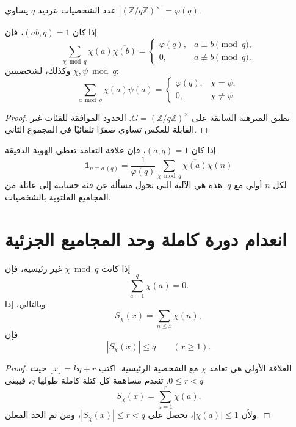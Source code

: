 عدد الشخصيات بترديد \(q\) يساوي
\(|(\mathbb Z/q\mathbb Z)^{\times}|=\varphi(q)\).

\begin{corollary}
\label{cor:dirichlet-character-orthogonality}
\provedhere
إذا كان \((ab,q)=1\)، فإن
\[
\sum_{\chi\bmod q}\chi(a)\overline{\chi(b)}
=
\begin{cases}
\varphi(q),&a\equiv b\pmod q,\\
0,&a\not\equiv b\pmod q.
\end{cases}
\]
وكذلك، لشخصيتين \(\chi,\psi\bmod q\):
\[
\sum_{a\bmod q}\chi(a)\overline{\psi(a)}
=
\begin{cases}
\varphi(q),&\chi=\psi,\\
0,&\chi\ne\psi.
\end{cases}
\]
\end{corollary}

\begin{proof}
نطبق المبرهنة السابقة على
\(G=(\mathbb Z/q\mathbb Z)^{\times}\). الحدود الموافقة للفئات غير
القابلة للعكس تساوي صفرًا تلقائيًا في المجموع الثاني.
\end{proof}

\begin{remark}
إذا كان \((a,q)=1\)، فإن علاقة التعامد تعطي الهوية الدقيقة
\[
\mathbf 1_{n\equiv a\, (q)}
=
\frac1{\varphi(q)}
\sum_{\chi\bmod q}\overline{\chi(a)}\chi(n)
\]
لكل \(n\) أولي مع \(q\). هذه هي الآلية التي تحول مسألة عن فئة حسابية
إلى عائلة من المجاميع الملتوية بالشخصيات.
\end{remark}

\section{انعدام دورة كاملة وحد المجاميع الجزئية}

\begin{proposition}
\label{prop:nonprincipal-character-partial-sums}
\provedhere
إذا كانت \(\chi\bmod q\) غير رئيسية، فإن
\[
\sum_{a=1}^{q}\chi(a)=0.
\]
وبالتالي، إذا
\[
S_\chi(x)=\sum_{n\leq x}\chi(n),
\]
فإن
\[
|S_\chi(x)|\leq q
\qquad(x\geq1).
\]
\end{proposition}

\begin{proof}
العلاقة الأولى هي تعامد \(\chi\) مع الشخصية الرئيسية. اكتب
\(\lfloor x\rfloor=kq+r\) حيث \(0\leq r<q\). تنعدم مساهمة كل كتلة
كاملة طولها \(q\)، فيبقى
\[
S_\chi(x)=\sum_{a=1}^{r}\chi(a).
\]
ولأن \(|\chi(a)|\leq1\)، نحصل على \(|S_\chi(x)|\leq r<q\)، ومن ثم
الحد المعلن.
\end{proof}

